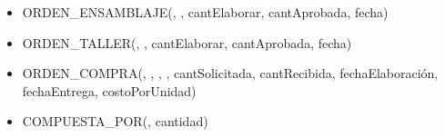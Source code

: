 \documentclass[]{report}
\begin{document}
\begin{itemize}
	\item ORDEN\_ENSAMBLAJE(, , cantElaborar, cantAprobada, fecha)\par
	
	\item ORDEN\_TALLER(, , cantElaborar, cantAprobada, fecha)\par
	
	\item ORDEN\_COMPRA(, , , , cantSolicitada, cantRecibida, fechaElaboración, fechaEntrega, costoPorUnidad)\par
	
	\item COMPUESTA\_POR(, cantidad)\par
\end{itemize}
	
	
\end{document}
